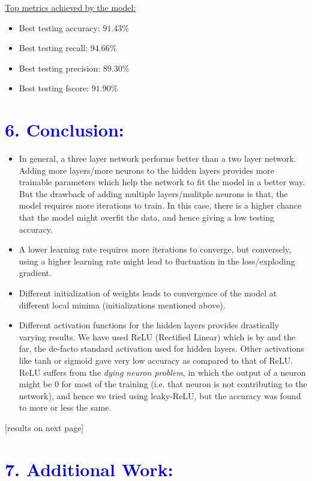 \documentclass[a4paper,10pt,twocolumn]{article}
\begin{document}
\newline
\underline{Top metrics achieved by the model:}
\begin{itemize}
\item{Best testing accuracy: $91.43\%$}
\item{Best testing recall: $94.66\%$}
\item{Best testing precision: $89.30\%$}
\item{Best testing fscore: $91.90\%$}
\end{itemize}

\section*{\textcolor{blue}{6. Conclusion:}}
\begin{itemize}
\item{In general, a three layer network performs better than a two layer network. Adding more layers/more neurons to the hidden layers provides more trainable parameters which help the network to fit the model in a better way. But the drawback of adding multiple layers/mulitple neurons is that, the model requires more iterations to train. In this case, there is a higher chance that the model might overfit the data, and hence giving a low testing accuracy.}
\item{A lower learning rate requires more iterations to converge, but conversely, using a higher learning rate might lead to fluctuation in the loss/exploding gradient.}
\item{Different initialization of weights leads to convergence of the model at different local minima (initializations mentioned above).}
\item{Different activation functions for the hidden layers provides drastically varying results. We	 have used ReLU (Rectified Linear) which is by and the far, the de-facto standard activation used for hidden layers. Other activations like tanh or sigmoid gave very low accuracy as compared to that of ReLU. ReLU suffers from the \emph{dying neuron problem}, in which the output of a neuron might be 0 for most of the training (i.e. that neuron is not contributing to the network), and hence we tried using leaky-ReLU, but the accuracy was found to more or less the same.}
\end{itemize}
[results on next page]

\section*{\textcolor{blue}{7. Additional Work:}}
\end{document}
